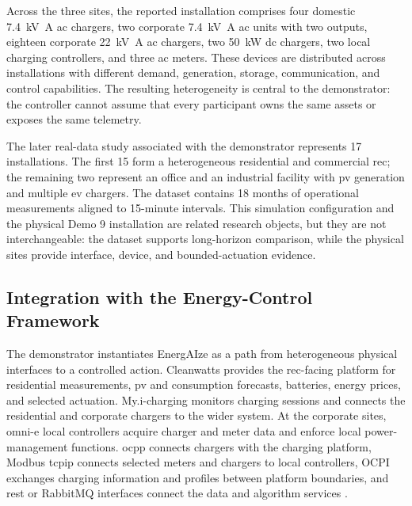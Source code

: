Across the three sites, the reported installation comprises four domestic \SI{7.4}{\kilo\volt\ampere} \gls{ac} chargers, two corporate \SI{7.4}{\kilo\volt\ampere} \gls{ac} units with two outputs, eighteen corporate \SI{22}{\kilo\volt\ampere} \gls{ac} chargers, two \SI{50}{\kilo\watt} \gls{dc} chargers, two local charging controllers, and three \gls{ac} meters. These devices are distributed across installations with different demand, generation, storage, communication, and control capabilities. The resulting heterogeneity is central to the demonstrator: the controller cannot assume that every participant owns the same assets or exposes the same telemetry.

The later real-data study associated with the demonstrator represents 17 installations. The first 15 form a heterogeneous residential and commercial \gls{rec}; the remaining two represent an office and an industrial facility with \gls{pv} generation and multiple \gls{ev} chargers. The dataset contains 18 months of operational measurements aligned to 15-minute intervals. This simulation configuration and the physical Demo 9 installation are related research objects, but they are not interchangeable: the dataset supports long-horizon comparison, while the physical sites provide interface, device, and bounded-actuation evidence.

\subsection{Integration with the Energy-Control Framework}
\label{sec:opeva-integration}

The demonstrator instantiates EnergAIze as a path from heterogeneous physical interfaces to a controlled action. Cleanwatts provides the \gls{rec}-facing platform for residential measurements, \gls{pv} and consumption forecasts, batteries, energy prices, and selected actuation. My.i-charging monitors charging sessions and connects the residential and corporate chargers to the wider system. At the corporate sites, omni-e local controllers acquire charger and meter data and enforce local power-management functions. \gls{ocpp} connects chargers with the charging platform, Modbus \gls{tcpip} connects selected meters and chargers to local controllers, OCPI exchanges charging information and profiles between platform boundaries, and \gls{rest} or RabbitMQ interfaces connect the data and algorithm services \parencite{opeva2026d63}.

